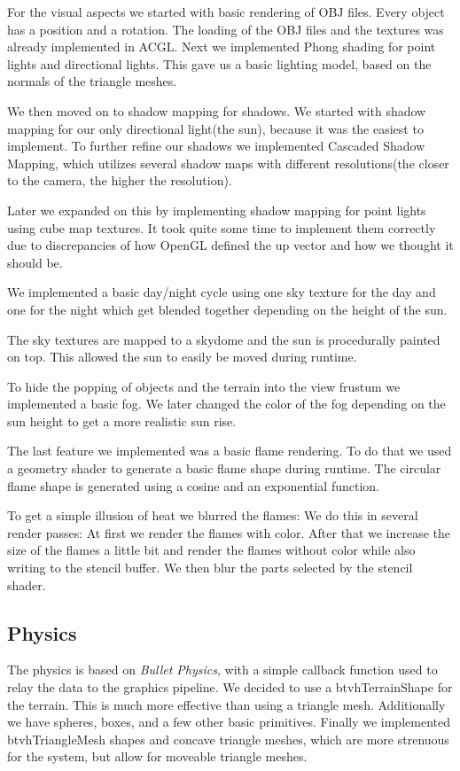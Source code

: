 \documentclass[sponsored]{acmsiggraph}
\begin{document}
For the visual aspects we started with basic rendering of OBJ files. Every object has a position and a rotation.
The loading of the OBJ files and the textures was already implemented in ACGL.
Next we implemented Phong shading for point lights and directional lights.
This gave us a basic lighting model, based on the normals of the triangle meshes.

We then moved on to shadow mapping for shadows.
We started with shadow mapping for our only directional light(the sun), because it was the easiest to implement.
To further refine our shadows we implemented Cascaded Shadow Mapping, which utilizes several shadow maps with different
resolutions(the closer to the camera, the higher the resolution).

Later we expanded on this by implementing shadow mapping for point lights using cube map textures. It took quite some time to implement them correctly due to
discrepancies of how OpenGL defined the up vector and how we thought it should be.

We implemented a basic day/night cycle using one sky texture for the day and one for the night which get blended together depending on the height of the sun.

The sky textures are mapped to a skydome and the sun is procedurally painted on top. This allowed the sun to easily be moved during runtime.

To hide the popping of objects and the terrain into the view frustum we implemented a basic fog.
We later changed the color of the fog depending on the sun height to get a more realistic sun rise.

The last feature we implemented was a basic flame rendering. 
To do that we used a geometry shader to generate a basic flame shape during runtime.
The circular flame shape is generated using a cosine and an exponential function.

To get a simple illusion of heat we blurred the flames:
We do this in several render passes:
At first we render the flames with color.
After that we increase the size of the flames a little bit and render the flames without color while also writing to the stencil buffer.
We then blur the parts selected by the stencil shader.

\subsection{Physics}

The physics is based on \textit{Bullet Physics}, with a simple callback function used to relay the data to the graphics pipeline. We decided to use  a btvhTerrainShape for the terrain. This is much more effective than using a triangle mesh. Additionally we have spheres, boxes, and a few other basic primitives. Finally we implemented btvhTriangleMesh shapes and concave triangle meshes, which are more strenuous for the system, but allow for moveable triangle meshes.
\end{document}

